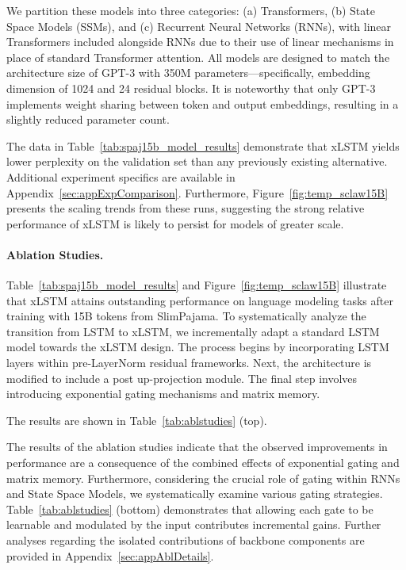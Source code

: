 We partition these models into three categories: (a) Transformers, (b) State Space Models (SSMs), and (c) Recurrent Neural Networks (RNNs), with linear Transformers included alongside RNNs due to their use of linear mechanisms in place of standard Transformer attention. All models are designed to match the architecture size of GPT-3 with 350M parameters—specifically, embedding dimension of 1024 and 24 residual blocks. It is noteworthy that only GPT-3 implements weight sharing between token and output embeddings, resulting in a slightly reduced parameter count.

The data in Table~\ref{tab:spaj15b_model_results} demonstrate that xLSTM yields lower perplexity on the validation set than any previously existing alternative. Additional experiment specifics are available in Appendix~\ref{sec:appExpComparison}. Furthermore, Figure~\ref{fig:temp_sclaw15B} presents the scaling trends from these runs, suggesting the strong relative performance of xLSTM is likely to persist for models of greater scale.

\paragraph{Ablation Studies.}
Table~\ref{tab:spaj15b_model_results} and Figure~\ref{fig:temp_sclaw15B} illustrate that xLSTM attains outstanding performance on language modeling tasks after training with 15B tokens from SlimPajama. To systematically analyze the transition from LSTM to xLSTM, we incrementally adapt a standard LSTM model towards the xLSTM design. The process begins by incorporating LSTM layers within pre-LayerNorm residual frameworks. Next, the architecture is modified to include a post up-projection module. The final step involves introducing exponential gating mechanisms and matrix memory.

The results are shown in Table~\ref{tab:ablstudies} (top). 

The results of the ablation studies indicate that the observed improvements in performance are a consequence of the combined effects of exponential gating and matrix memory. Furthermore, considering the crucial role of gating within RNNs and State Space Models, we systematically examine various gating strategies. Table~\ref{tab:ablstudies} (bottom) demonstrates that allowing each gate to be learnable and modulated by the input contributes incremental gains. Further analyses regarding the isolated contributions of backbone components are provided in Appendix~\ref{sec:appAblDetails}.

